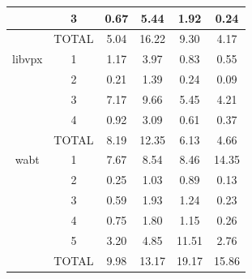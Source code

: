 \documentclass[a4paper,11pt,oneside]{report}
\begin{document}
\begin{table}[h]
\begin{tabular}{|c|c|c|c|c|c|}
     & 3 & 0.67 & 5.44 & 1.92 & 0.24  \\
     \hline
     & TOTAL & 5.04 & 16.22 & 9.30 & 4.17  \\
    \hline
    \multirow{1}{*}{libvpx} & 1 & 1.17 & 3.97 & 0.83 & 0.55 \\
     & 2 & 0.21 & 1.39 & 0.24 & 0.09 \\
     & 3 & 7.17 & 9.66 & 5.45 & 4.21  \\
     & 4 & 0.92 & 3.09 & 0.61 & 0.37 \\
     \hline
     & TOTAL & 8.19 & 12.35 & 6.13 & 4.66  \\
    \hline
    \multirow{1}{*}{wabt} & 1 & 7.67 & 8.54 & 8.46 & 14.35 \\
     & 2 & 0.25 & 1.03 & 0.89 & 0.13 \\
     & 3 & 0.59 & 1.93 & 1.24 & 0.23  \\
     & 4 & 0.75 & 1.80 & 1.15 & 0.26 \\
     & 5 & 3.20 & 4.85 & 11.51 & 2.76 \\
     \hline
     & TOTAL & 9.98 & 13.17 & 19.17 & 15.86  \\
    \hline
  \end{tabular}
\end{table}
\end{document}

